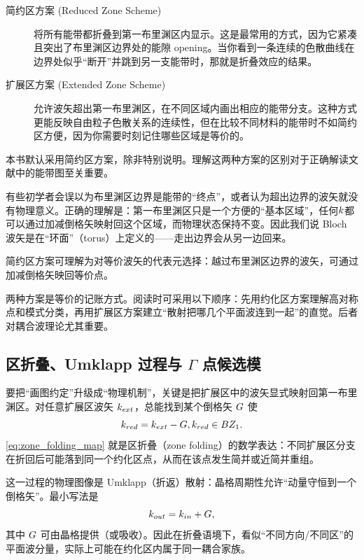 \begin{description}
  \item[简约区方案 (Reduced Zone Scheme)] 将所有能带都折叠到第一布里渊区内显示。这是最常用的方式，因为它紧凑且突出了布里渊区边界处的能隙 opening。当你看到一条连续的色散曲线在边界处似乎“断开”并跳到另一支能带时，那就是折叠效应的结果。
  
  \item[扩展区方案 (Extended Zone Scheme)] 允许波矢超出第一布里渊区，在不同区域内画出相应的能带分支。这种方式更能反映自由粒子色散关系的连续性，但在比较不同材料的能带时不如简约区方便，因为你需要时刻记住哪些区域是等价的。
\end{description}

本书默认采用简约区方案，除非特别说明。理解这两种方案的区别对于正确解读文献中的能带图至关重要。

\begin{WhatCouldGoWrong}
有些初学者会误以为布里渊区边界是能带的“终点”，或者认为超出边界的波矢就没有物理意义。正确的理解是：第一布里渊区只是一个方便的“基本区域”，任何$k$都可以通过加减倒格矢映射回这个区域，而物理状态保持不变。因此我们说 Bloch 波矢是在“环面”（torus）上定义的——走出边界会从另一边回来。
\end{WhatCouldGoWrong}

\begin{IntuitionBox}
简约区方案可理解为对等价波矢的代表元选择：越过布里渊区边界的波矢，可通过加减倒格矢映回等价点。
\end{IntuitionBox}
两种方案是等价的记账方式。阅读时可采用以下顺序：先用约化区方案理解高对称点和模式分类，再用扩展区方案建立“散射把哪几个平面波连到一起”的直觉。后者对耦合波理论尤其重要。

\subsection{区折叠、Umklapp 过程与 \texorpdfstring{$\Gamma$}{Gamma} 点候选模}
要把“画图约定”升级成“物理机制”，关键是把扩展区中的波矢显式映射回第一布里渊区。对任意扩展区波矢 $k_{ext}$，总能找到某个倒格矢 $G$ 使
\begin{equation}
k_{red}=k_{ext}-G,
k_{red}\in BZ_1.
\label{eq:zone_folding_map}
\end{equation}
\cref{eq:zone_folding_map} 就是区折叠（zone folding）的数学表达：不同扩展区分支在折回后可能落到同一个约化区点，从而在该点发生简并或近简并重组。

这一过程的物理图像是 Umklapp（折返）散射：晶格周期性允许“动量守恒到一个倒格矢”。最小写法是
\begin{equation}
k_{out}=k_{in}+G,
\label{eq:umklapp_momentum}
\end{equation}
其中 $G$ 可由晶格提供（或吸收）。因此在折叠语境下，看似“不同方向/不同区”的平面波分量，实际上可能在约化区内属于同一耦合家族。


